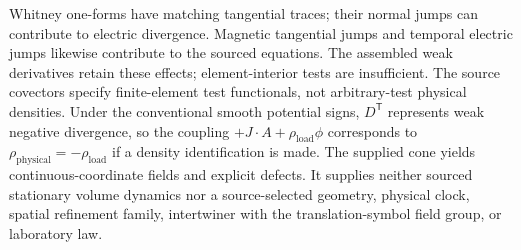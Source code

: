 Whitney one-forms have matching tangential traces; their normal jumps can
contribute to electric divergence. Magnetic tangential jumps and temporal
electric jumps likewise contribute to the sourced equations. The assembled
weak derivatives retain these effects; element-interior tests are
insufficient. The source covectors specify finite-element test functionals,
not arbitrary-test physical densities. Under the conventional smooth
potential signs, \(D^{\mathsf T}\) represents weak negative divergence, so
the coupling \(+J\cdot A+\rho_{\mathrm{load}}\phi\) corresponds to
\(\rho_{\mathrm{physical}}=-\rho_{\mathrm{load}}\) if a density
identification is made.
The supplied cone yields continuous-coordinate fields and explicit
defects. It supplies neither sourced stationary volume dynamics nor a
source-selected geometry, physical clock, spatial refinement family,
intertwiner with the translation-symbol field group, or laboratory law.

